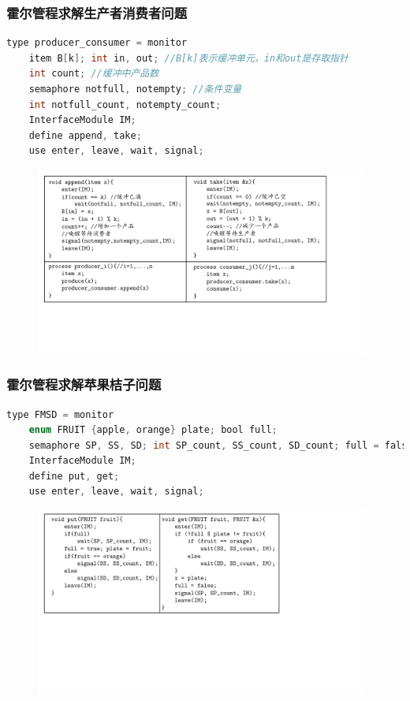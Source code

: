 \documentclass[cs4size,a4paper,10pt]{ctexart}
\begin{document}
	\subsubsection{霍尔管程求解生产者消费者问题}
	\begin{lstlisting}[language=C, keywordstyle=\color{black}]
type producer_consumer = monitor
	item B[k]; int in, out; //B[k]表示缓冲单元，in和out是存取指针 
	int count; //缓冲中产品数
	semaphore notfull, notempty; //条件变量
	int notfull_count, notempty_count;
	InterfaceModule IM;
	define append, take;
	use enter, leave, wait, signal;
	\end{lstlisting}

	\begin{figure}[H]
		\centering
		\includegraphics[width=0.98\textwidth]{img/霍尔管程求解生产者消费者问题.pdf}
	\end{figure}


	\subsubsection{霍尔管程求解苹果桔子问题}
	\begin{lstlisting}[language=C, keywordstyle=\color{black}]
type FMSD = monitor
	enum FRUIT {apple, orange} plate; bool full;
	semaphore SP, SS, SD; int SP_count, SS_count, SD_count; full = false
	InterfaceModule IM;
	define put, get;
	use enter, leave, wait, signal;
	\end{lstlisting}

	\begin{figure}[H]
		\centering
		\includegraphics[width=0.98\textwidth]{img/霍尔管程求解苹果桔子问题1.pdf}
	\end{figure}
\end{document}
